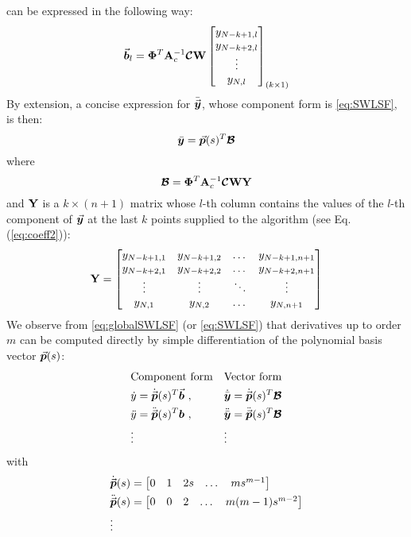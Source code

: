 can be expressed in the 
following way:
\begin{equation}
	\vec{\bm{b}}_l = 
	\mathbf{\Phi}^T\mathbf{A}_c^{-1}\bm{\mathcal{C}}\mathbf{W}\begin{bmatrix}
		y_{N-k+1,l} \\ y_{N-k+2,l}\\ \vdots \\ y_{N,l}
	\end{bmatrix}_{(k\times 1)}
	\label{eq:coeff2}
\end{equation}
By extension, a concise expression for $\bar{\vec{\bm{y}}}$, whose component form is
\ref{eq:SWLSF}, is then:
\begin{equation}
	\bar{\bm{y}}=\vec{\bm{p}}(s)^T\bm{\mathcal{B}}
	\label{eq:globalSWLSF}
\end{equation}
where
\begin{equation}
	\bm{\mathcal{B}}=\mathbf{\Phi}^T\mathbf{A}_c^{-1}\bm{\mathcal{C}}\mathbf{W}\mathbf{Y}
	\label{eq:B}
\end{equation}
and $\mathbf{Y}$ is a $k\times(n+1)$ matrix whose $l$-th column contains
the values of the $l$-th component of $\vec{\bm{y}}$ at the last $k$ points
supplied to the algorithm (see Eq. (\ref{eq:coeff2})):
\begin{equation}
	\mathbf{Y}=\begin{bmatrix}
		y_{N-k+1,1} & y_{N-k+1,2} & \dots & y_{N-k+1,n+1}\\
		y_{N-k+2,1} & y_{N-k+2,2} & \dots & y_{N-k+2,n+1}\\
		\vdots      & \vdots      & \ddots & \vdots\\
		y_{N,1} & y_{N,2} & \dots & y_{N,n+1}\\
	\end{bmatrix}
	\label{eq:Y}
\end{equation}
We observe from \ref{eq:globalSWLSF} (or \ref{eq:SWLSF}) that derivatives up 
to order $m$ can be computed directly by simple differentiation of the 
polynomial basis vector $\vec{\bm{p}}(s)$:
\begin{align}
	& \text{Component form} && \text{Vector form}\nonumber\\
	&\dot{y} = \dot{\vec{\bm{p}}}(s)^T\vec{\bm{b}}\ , &&
	\dot{\bar{\bm{y}}}= \dot{\vec{\bm{p}}}(s)^T\bm{\mathcal{B}}\nonumber\\
	&\ddot{y} = \ddot{\vec{\bm{p}}}(s)^T\bm{b}\ , &&
	\ddot{\bar{\bm{y}}}= \ddot{\vec{\bm{p}}}(s)^T\bm{\mathcal{B}}\nonumber\\
	&\vdots && \vdots\nonumber
\end{align}
with 
\begin{align*}
	&\dot{\vec{\bm{p}}}(s)=\begin{bmatrix}
		0 & 1 & 2s & \dots & ms^{m-1}
	\end{bmatrix}\\
	&\ddot{\vec{\bm{p}}}(s)=\begin{bmatrix}
		0 & 0 & 2 & \dots & m(m-1)s^{m-2}
	\end{bmatrix}\\
	&\vdots
\end{align*}


